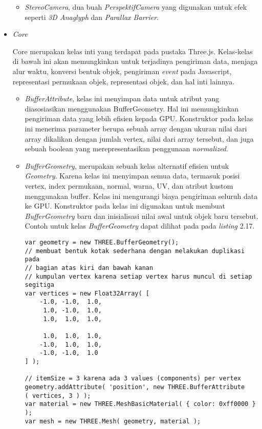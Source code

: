 \begin{itemize}
\begin{itemize}
	\item {\it StereoCamera}, dua buah {\it PerspektifCamera} yang digunakan untuk efek seperti {\it 3D Anaglyph} dan {\it Parallax Barrier}.

	\end{itemize}
	
\item \textit{Core}

	Core merupakan kelas inti yang terdapat pada pustaka Three.js. Kelas-kelas di bawah ini akan memungkinkan untuk terjadinya pengiriman data, menjaga alur waktu, konversi bentuk objek, pengiriman {\it event} pada Javascript, representasi permukaan objek, representasi objek, dan hal inti lainnya.
	\begin{itemize}
	\item{\it BufferAttribute}, kelas ini menyimpan data untuk atribut yang diasosiasikan menggunakan BufferGeometry. Hal ini memungkinkan pengiriman data yang lebih efisien kepada GPU. Konstruktor pada kelas ini menerima parameter berupa sebuah array dengan ukuran nilai dari array dikalikan dengan jumlah vertex, nilai dari array tersebut, dan juga sebuah boolean yang merepresentasikan penggunaan {\it normalized}.
	\item{\it BufferGeometry}, merupakan sebuah kelas alternatif efisien untuk {\it Geometry}. Karena kelas ini menyimpan semua data, termasuk posisi vertex, index permukaan, normal, warna, UV, dan atribut kustom menggunakan buffer. Kelas ini mengurangi biaya pengiriman seluruh data ke GPU. Konstruktor pada kelas ini digunakan untuk membuat {\it BufferGeometry} baru dan inisialisasi nilai awal untuk objek baru tersebut. Contoh untuk kelas {\it BufferGeometry} dapat dilihat pada pada {\it listing} 2.17.
\begin{lstlisting}[caption={Contoh instansiasi kelas {\it BufferGeometry} dengan membuat bentuk kotak sederhana.},captionpos=b]
var geometry = new THREE.BufferGeometry();
// membuat bentuk kotak sederhana dengan melakukan duplikasi pada
// bagian atas kiri dan bawah kanan
// kumpulan vertex karena setiap vertex harus muncul di setiap segitiga
var vertices = new Float32Array( [
	-1.0, -1.0,  1.0,
	 1.0, -1.0,  1.0,
	 1.0,  1.0,  1.0,

	 1.0,  1.0,  1.0,
	-1.0,  1.0,  1.0,
	-1.0, -1.0,  1.0
] );

// itemSize = 3 karena ada 3 values (components) per vertex
geometry.addAttribute( 'position', new THREE.BufferAttribute
( vertices, 3 ) );
var material = new THREE.MeshBasicMaterial( { color: 0xff0000 } );
var mesh = new THREE.Mesh( geometry, material );
\end{lstlisting}


\end{itemize}
\end{itemize}
